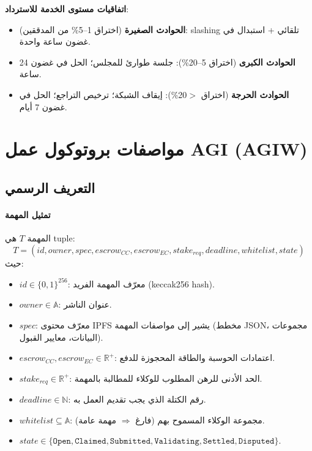 \documentclass[11pt]{article}
\begin{document}
\textbf{اتفاقيات مستوى الخدمة للاسترداد}:
\begin{itemize}[noitemsep]
  \item \textbf{الحوادث الصغيرة} (اختراق 1--5\% من المدققين): slashing تلقائي + استبدال في غضون ساعة واحدة.
  \item \textbf{الحوادث الكبرى} (اختراق 5--20\%): جلسة طوارئ للمجلس؛ الحل في غضون 24 ساعة.
  \item \textbf{الحوادث الحرجة} (اختراق $>$20\%): إيقاف الشبكة؛ ترخيص التراجع؛ الحل في غضون 7 أيام.
\end{itemize}

\section{مواصفات بروتوكول عمل AGI (AGIW)}
\label{sec:agiw-spec}

\subsection{التعريف الرسمي}
\paragraph{تمثيل المهمة} المهمة $T$ هي tuple:
\begin{equation}
T = (id, owner, spec, escrow_{CC}, escrow_{EC}, stake_{req}, deadline, whitelist, state)
\end{equation}
حيث:
\begin{itemize}[noitemsep]
  \item $id \in \{0,1\}^{256}$: معرّف المهمة الفريد (keccak256 hash).
  \item $owner \in \mathbb{A}$: عنوان الناشر.
  \item $spec$: معرّف محتوى IPFS يشير إلى مواصفات المهمة (مخطط JSON، مجموعات البيانات، معايير القبول).
  \item $escrow_{CC}, escrow_{EC} \in \mathbb{R}^+$: اعتمادات الحوسبة والطاقة المحجوزة للدفع.
  \item $stake_{req} \in \mathbb{R}^+$: الحد الأدنى للرهن المطلوب للوكلاء للمطالبة بالمهمة.
  \item $deadline \in \mathbb{N}$: رقم الكتلة الذي يجب تقديم العمل به.
  \item $whitelist \subseteq \mathbb{A}$: مجموعة الوكلاء المسموح بهم (فارغ $\Rightarrow$ مهمة عامة).
  \item $state \in \{\texttt{Open}, \texttt{Claimed}, \texttt{Submitted}, \texttt{Validating}, \texttt{Settled}, \texttt{Disputed}\}$.
\end{itemize}
\end{document}
